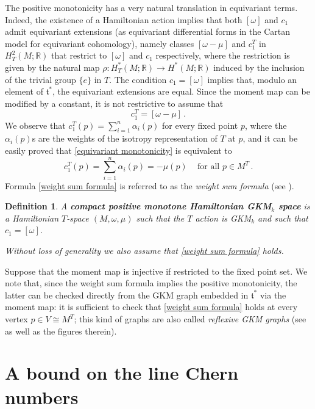 \documentclass[12pt,a4paper]{amsart}
\newcommand{\RR}{\mathbb{R}}
\theoremstyle{plain}
\newtheorem{defn}[thm]{Definition}
\theoremstyle{definition}
\begin{document}
The positive monotonicity has a very natural translation in equivariant terms. Indeed, the existence of a Hamiltonian action implies that both $[\omega]$ and $c_1$ admit equivariant extensions
 (as equivariant differential forms in the Cartan model for
 equivariant cohomology),
namely classes $[\omega-\mu]$ and $c_1^T$ in $H^2_T(M;\RR)$ that restrict to $[\omega]$ and $c_1$ respectively, where the restriction is given by the natural
map $\rho\colon H^*_T(M;\RR)\to H^*(M;\RR)$ induced by the inclusion of the trivial group $\{e\}$ in $T$. The condition $c_1=[\omega]$ implies that, modulo
an element of $\mathfrak{t}^*$, the equivariant extensions are equal. Since the moment map
can be modified by a constant, it is not restrictive to assume that 
\begin{equation}\label{equivariant monotonicity}
c_1^T=[\omega-\mu]\,.
\end{equation}
We observe that $c_1^T(p)=\sum_{i=1}^n \alpha_i(p)$ for every fixed point $p$, where the $\alpha_i(p)$s are the weights of the isotropy representation of $T$ at $p$, and it can be easily proved
that \eqref{equivariant monotonicity} is equivalent to 
\begin{equation}\label{weight sum formula}
c_1^T(p)=\sum_{i=1}^n \alpha_i(p) = -\mu(p)\, \quad \text{for all }p\in M^T\,.
\end{equation}
Formula \eqref{weight sum formula} is referred to as the \emph{weight sum formula} (see \cite[Section 3.1]{CSSMonotone}).
\begin{defn}
A \textbf{compact positive monotone Hamiltonian GKM$_k$ space} is a Hamiltonian $T$-space $(M,\omega,\mu)$ such that the $T$ action is GKM$_k$ and such that 
$c_1=[\omega]$. 

Without loss of generality we also assume that \eqref{weight sum formula} holds.
\end{defn}
Suppose that the moment map is injective if restricted to the fixed point set. 
We note that, since the weight sum formula implies the positive monotonicity, the latter can be checked directly from the GKM graph embedded in $\mathfrak{t}^*$ via the moment map: it is sufficient to
check that \eqref{weight sum formula} holds at every vertex $p\in V \cong M^T$; this kind of graphs are also called \emph{reflexive GKM graphs} (see \cite[Section 5.3]{MR3695881} as well as the figures therein).

\section{A bound on the line Chern numbers}
\label{sec: CLN bound}
\end{document}
